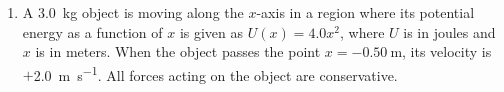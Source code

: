 {\begin{enumerate}
  \item A \SI{3.0}{\kilo\gram} object is moving along the $x$-axis in a
    region where its potential energy as a function of $x$ is given as
    $U(x)=4.0x^2$, where $U$ is in joules and $x$ is in meters. When the object
    passes the point $x=\SI{-0.50}\metre$, its velocity is
    $+$\SI{2.0}{\metre\per\second}. All forces acting on the object are
    conservative.
    

\end{enumerate}}
